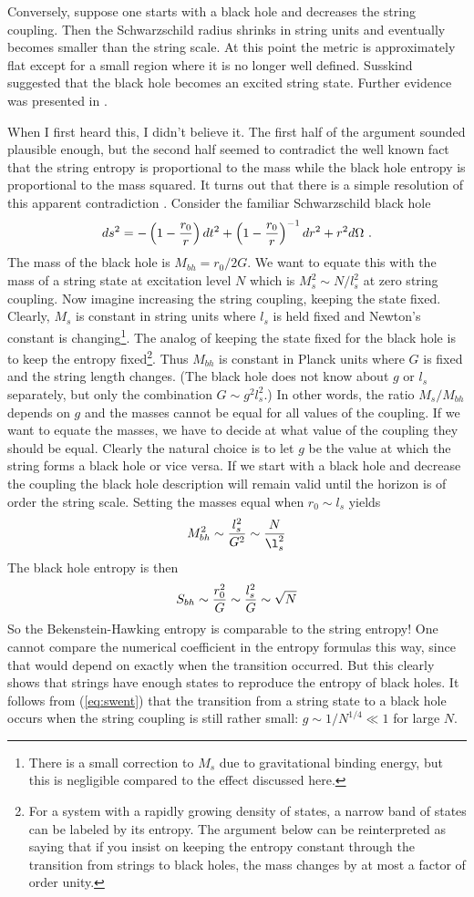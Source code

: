 \documentclass[12pt]{article}
\newcommand{\eq}{\begin{equation}}
\newcommand{\eqe}{\end{equation}}
\newcommand{\e}[1]{\label{eq:#1}}
\newcommand{\ee}[1]{(\ref{eq:#1})}
\begin{document}
Conversely, suppose  one starts with a black hole and decreases the
string coupling. Then the Schwarzschild radius
shrinks in string units and 
eventually becomes smaller than the string scale. At this point
the metric is approximately flat except for a small region where it is
no longer well defined. Susskind suggested that the 
black hole becomes an excited string state. Further evidence was presented
in \cite{hkrs}.

When I first heard this, I didn't believe it. The first half of the argument
sounded plausible enough, but the second half seemed to contradict the
well known fact that the string entropy is
proportional to the mass while the black hole entropy is proportional to the
mass squared. It turns out that there is a simple resolution of
this apparent contradiction \cite{hopo}.
Consider the familiar Schwarzschild black hole
\eq \e{schw}
ds^2 =-\left( 1 - {r_0\over r}\right) dt^2 + \left( 1 - {r_0\over r}\right)^{-1}
dr^2 + r^2 d\Omega\ .
\eqe
The mass of the black hole is $M_{bh} = r_0/2G$. We want to equate this
with the mass of a string state at excitation level $N$ which is $M_s^2 \sim
N/l_s^2$ at zero string coupling. Now imagine increasing the string coupling,
keeping the state fixed.
Clearly, $M_s$ is constant in string units
where $l_s$ is held fixed and Newton's constant is changing\footnote{There
is  a small correction to $M_s$ due to gravitational binding energy, but
this is negligible compared to the effect discussed here.}. The analog of 
keeping the state fixed for the black hole is to keep the entropy 
fixed\footnote{For a system with a rapidly growing density of states,
a narrow band of
states can be labeled by its entropy. The argument below can be reinterpreted
as saying that if you insist on keeping the entropy constant through the
transition from strings to black holes, the mass changes by at most a
factor of order unity.}.
Thus $M_{bh}$
is constant in Planck units where $G$ is fixed and the string length changes.
(The black hole does not know about $g$ or $l_s$ separately, but only 
the combination $G\sim g^2 l_s^2$.) In
other words, the ratio $M_s/M_{bh}$ depends on $g$ and the masses cannot
be equal for all values of the coupling. If we want to equate the masses,
we have to decide at what value of the coupling they should be equal. Clearly
the natural choice is to let $g$ be the value at which the string forms
a black hole or vice versa.
 If we start with a black hole and decrease the coupling
the black hole description
will remain valid until the horizon is of order the string
scale.
Setting the masses equal when $r_0 \sim l_s$ yields
\eq
M_{bh}^2 \sim {l_s^2 \over G^2} \sim {N\over \l_s^2} \e{match}
\eqe
The black hole entropy is then
\eq\e{swent}
S_{bh} \sim {r_0^2 \over G}\sim {l_s^2 \over G} \sim \sqrt N
\eqe
So the Bekenstein-Hawking entropy is comparable to the string
entropy! 
One cannot compare the numerical coefficient in the entropy formulas
this way, since that would depend on exactly when the transition occurred.
But this clearly shows that  strings
have enough states to reproduce the entropy of black holes.
It follows from \ee{swent} that
the transition from a string state to a black hole occurs when the
string coupling is still rather small: $g\sim 1/N^{1/4}
\ll 1$ for large $N$.
\end{document}
